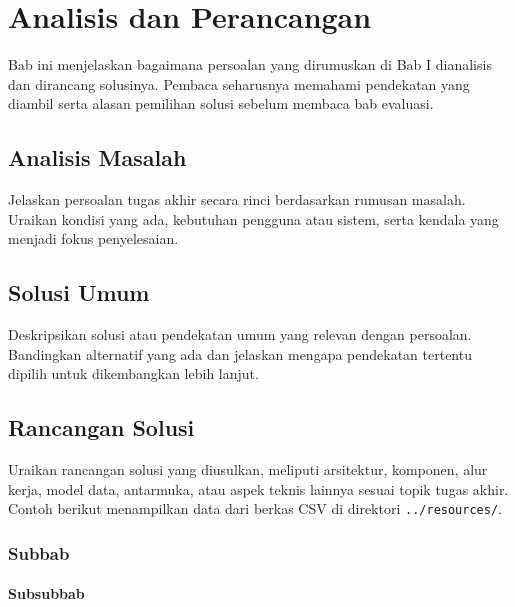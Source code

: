 %
%
%
%
%

\chapter{Analisis dan Perancangan}

Bab ini menjelaskan bagaimana persoalan yang dirumuskan di Bab I
dianalisis dan dirancang solusinya. Pembaca seharusnya memahami
pendekatan yang diambil serta alasan pemilihan solusi sebelum
membaca bab evaluasi.

\section{Analisis Masalah}

Jelaskan persoalan tugas akhir secara rinci berdasarkan rumusan
masalah. Uraikan kondisi yang ada, kebutuhan pengguna atau sistem,
serta kendala yang menjadi fokus penyelesaian.

\blindtext

\section{Solusi Umum}

Deskripsikan solusi atau pendekatan umum yang relevan dengan
persoalan. Bandingkan alternatif yang ada dan jelaskan mengapa
pendekatan tertentu dipilih untuk dikembangkan lebih lanjut.

\blindtext

\section{Rancangan Solusi}

Uraikan rancangan solusi yang diusulkan, meliputi arsitektur,
komponen, alur kerja, model data, antarmuka, atau aspek teknis
lainnya sesuai topik tugas akhir. Contoh berikut menampilkan data
dari berkas CSV di direktori \texttt{../resources/}.

\begin{table}[ht]
    \centering
    \caption{Kebutuhan fungsional sistem}
    \label{tab:sample-requirements}
\end{table}

\begin{table}[ht]
    \centering
    \caption{Komponen arsitektur sistem}
    \label{tab:sample-components}
\end{table}

    \subsection{Subbab}

    \blindtext

    \subsubsection{Subsubbab}

    \blindtext

\blindtext
